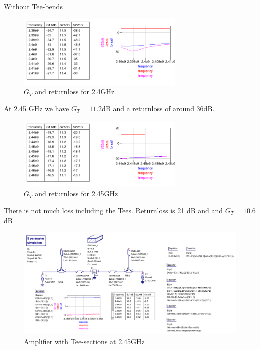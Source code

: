 \documentclass{article}
\begin{document}
Without Tee-bends

\begin{figure}[H]
\centering
  \includegraphics[width=80mm,scale=0.7]{Amp2_4GHzMicrostripNoTeeData1.png}
  \caption{$G_T$ and returnloss for 2.4GHz}
  \label{fig4}
\end{figure}
At 2.45 GHz we have $G_T = 11.2$dB and a returnloss of around 36dB.
\begin{figure}[H]
\centering
  \includegraphics[width=80mm,scale=0.5]{Amp2_4GHzMicrostripNoTeeData2.png}
  \caption{$G_T$ and returnloss for 2.45GHz}
  \label{fig4}
\end{figure}
There is not much loss including the Tees.
Returnloss is 21 dB and and $G_T = 10.6$dB
\begin{figure}[H]
\centering
  \includegraphics[width=\linewidth]{Amp2_4GHzMicrostripTee2.png}
  \caption{Amplifier with Tee-sections at 2.45GHz}
  \label{fig4}
\end{figure}
\end{document}
